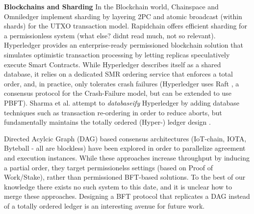 \textbf{Blockchains and Sharding}
In the Blockchain world, Chainspace \cite{al2017chainspace} and Omniledger \cite{kokoris2018omniledger} implement sharding by layering 2PC and atomic broadcast (within shards) for the UTXO transaction model. Rapidchain \cite{zamani2018rapidchain} offers efficient sharding for a permissionless system (what else? didnt read much, not so relevant). Hyperledger provides an enterprise-ready permissioned blockchain solution that simulates optimistic transaction processing by letting replicas speculatively execute Smart Contracts. While Hyperledger \cite{Hyperledger} describes itself as a shared database, it relies on a dedicated SMR ordering service that enforces a total order, and, in practice, only tolerates crash failures (Hyperledger uses Raft \cite{ongaro2014search}, a consensus protocol for the Crash-Failure model,  but can be extended to use PBFT). Sharma et al. attempt to \textit{databaseify} Hyperledger by adding database techniques such as transaction re-ordering in order to reduce aborts, but fundamentally maintains the totally ordered (Hyper-) ledger design \cite{sharma2018databasify}.  

Directed Acylcic Graph (DAG) based consensus architectures \cite{pervez2018comparative}(IoT-chain, IOTA, Byteball - all are blockless) have been explored  in order to parallelize agreement and execution instances. While these approaches increase throughput by inducing a partial order, they target permissionelss settings (based on Proof of Work/Stake), rather than permissioned BFT-based solutions. To the best of our knowledge there exists no such system to this date, and it is unclear how to merge these approaches. Designing a BFT protocol that replicates a DAG instead of a totally ordered ledger is an interesting avenue for future work.







